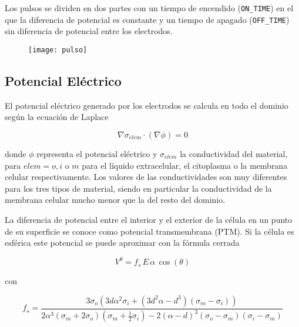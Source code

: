Los pulsos se dividen en dos partes con un tiempo de encendido (\texttt{ON\_TIME}) en el que la diferencia de potencial es constante y un tiempo de apagado (\texttt{OFF\_TIME}) sin diferencia de potencial entre los electrodos.

\begin{figure}[h]
	\centering
	\texttt{[image: pulso]}
\end{figure}


\subsection*{Potencial Eléctrico}
El potencial eléctrico generado por los electrodos se calcula en todo el dominio según la ecuación de Laplace \cite[p.~88]{c9-fem-electro}

\begin{equation} \label{eq:poisson}
	\nabla \sigma_{elem} \cdot (\nabla \phi) = 0 
\end{equation}

donde $\phi$ representa el potencial eléctrico y $\sigma_{elem}$ la conductividad del material, para $elem = o, i$ o $m$ para el líquido extracelular, el citoplasma o la membrana celular respectivamente. Los valores de las conductividades son muy diferentes para los tres tipos de material, siendo en particular la conductividad de la membrana celular mucho menor que la del resto del dominio.

La diferencia de potencial entre el interior y el exterior de la célula en un punto de su superficie se conoce como potencial transmembrana (PTM). Si la célula es esférica este potencial se puede aproximar con la fórmula cerrada \cite{tsong}

\begin{equation} \label{eq:cos}
	 V^{\theta} = f_s\, E\, \alpha\, \cos (\theta) 
\end{equation}

con

\begin{equation} \label{eq:lambda}
    f_s = \frac{3\sigma_o \left( 3 d \alpha^2 \sigma_i + \left( 3 d^2 \alpha - d^3 \right) \left(\sigma_m - \sigma_i \right) \right)}{2 \alpha^3 \left( \sigma_m + 2 \sigma_o \right) \left(\sigma_m + \frac{1}{2} \sigma_i \right) - 2 \left(\alpha - d \right)^3 \left(\sigma_o - \sigma_m \right) \left( \sigma_i - \sigma_m \right)}
\end{equation}


